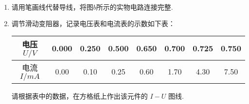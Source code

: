 \begin{enumerate}
\begin{enumerate}
\item
请用笔画线代替导线，将图$ b $所示的实物电路连接完整.
\begin{figure}[h!]
\centering
\begin{subfigure}{0.4\linewidth}
\centering
 
\caption{}\label{}
\end{subfigure}
\begin{subfigure}{0.4\linewidth}
\centering
 
\caption{}\label{}
\end{subfigure}

\end{figure}

\newpage

\item 
调节滑动变阻器，记录电压表和电流表的示数如下表：

\begin{table}[h!]
\centering 
\begin{tabular}{|c|c|c|c|c|c|c|c|}
\hline 
电压$ U/V $ & 0.000 & 0.250 & 0.500 & 0.650 & 0.700 & 0.725 & 0.750
\\
\hline
电流$ I/mA $ & 0.00 & 0.10 & 0.25 & 0.60 & 1.70 & 4.30 & 7.50\\ 
\hline 
\end{tabular}
\end{table} 




请根据表中的数据，在方格纸上作出该元件的 $ I-U $ 图线.

\begin{figure}[h!]
	\centering
%
\end{figure}
\end{enumerate}
\end{enumerate}
